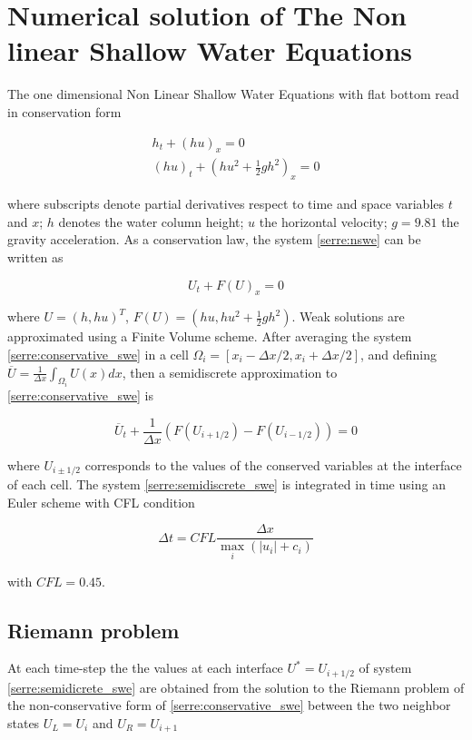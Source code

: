 \documentclass{article}
\begin{document}
\section{Numerical solution of The Non linear Shallow Water Equations}
\noindent The one dimensional Non Linear Shallow Water Equations with flat bottom read in conservation form

\begin{equation}
	\begin{split}
		h_t + ( hu)_x = 0\\
		(hu)_t + \left( hu^2 + \frac{1}{2}gh^2 \right)_x = 0 
	\end{split}
	\label{serre:snswe}
\end{equation}

\noindent where subscripts denote partial derivatives respect to time and space variables $t$ and $x$; $h$ denotes the water column height; $u$ the horizontal velocity; $g=9.81$ the gravity acceleration. As a conservation law, the system \eqref{serre:nswe} can be written as

\begin{equation}
	U_t + F(U)_x = 0
	\label{serre:conservative_swe}
\end{equation}

\noindent where $U=(h,hu)^T$, $F(U) = (hu, hu^2 + \frac{1}{2}gh^2)$. Weak solutions are approximated using a Finite Volume scheme. After averaging the system \eqref{serre:conservative_swe} in a cell $\Omega_i = [x_i-\Delta x/2, x_i+\Delta x/2]$, and defining $ \overline U = \frac{1}{\Delta x} \int_{\Omega_i} U(x)dx$, then a semidiscrete approximation to \eqref{serre:conservative_swe} is 

\begin{equation}
	\overline U _t + \frac{1}{\Delta x}\left( F(U_{i+1/2}) - F(U_{i-1/2}) \right) = 0
	\label{serre:semidiscrete_swe}
\end{equation}

\noindent where $U_{i\pm1/2}$ corresponds to the values of the conserved variables at the interface of each cell. The system \eqref{serre:semidiscrete_swe} is integrated in time using an Euler scheme with CFL condition

\begin{equation}
	\Delta t = CFL \frac{\Delta x}{\max_i(|u_i|+c_i)}
\end{equation}

with $CFL=0.45$.

\subsection{Riemann problem}
At each time-step the the values at each interface $U^* = U_{i+1/2}$ of system \eqref{serre:semidicrete_swe} are obtained from the solution to the Riemann problem of the non-conservative form of \eqref{serre:conservative_swe} between the two neighbor states $U_L = U_i$ and $U_R = U_{i+1}$
\end{document}
